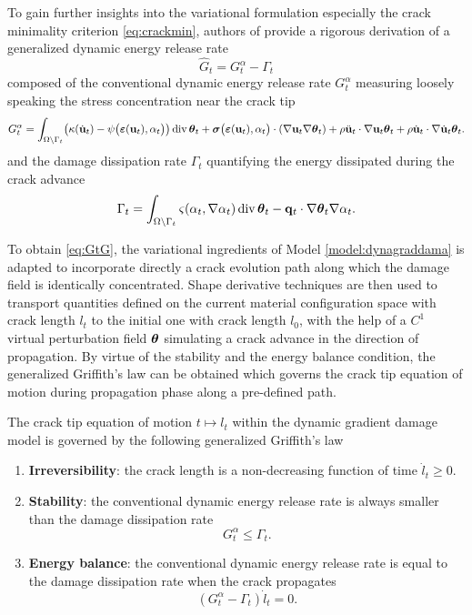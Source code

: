 To gain further insights into the variational formulation especially the crack minimality criterion \eqref{eq:crackmin}, authors of \cite{LiMarigo:2015} provide a rigorous derivation of a generalized dynamic energy release rate
\begin{equation}  \label{eq:GtG}
\widehat{G}_t=G_t^\alpha-\Gamma_t
\end{equation}
composed of the conventional dynamic energy release rate $G^\alpha_t$ measuring loosely speaking the stress concentration near the crack tip
\begin{equation} \label{eq:GtC}
G_t^\alpha=\int_\domaint\bigl(\kappa(\dot{\vec{u}}_t)-\psi\bigl(\eps(\vec{u}_t),\alpha_t\bigr)\bigr)\div\vtheta_t+\sig\bigl(\eps(\vec{u}_t),\alpha_t\bigr)\cdot(\nabla\vec{u}_t\nabla\vtheta_t)+\rho\ddot{\vec{u}}_t\cdot\nabla\vec{u}_t\vtheta_t+\rho\dot{\vec{u}}_t\cdot\nabla\dot{\vec{u}}_t\vtheta_t.
\end{equation}
and the damage dissipation rate $\Gamma_t$ quantifying the energy dissipated during the crack advance
\begin{equation} \label{eq:Gammat}
\Gamma_t=\int_\domaint\varsigma(\alpha_t,\nabla\alpha_t)\div\vtheta_t-\vec{q}_t\cdot\nabla\vtheta_t\nabla\alpha_t.
\end{equation}

To obtain \eqref{eq:GtG}, the variational ingredients of Model \ref{model:dynagraddama} is adapted to incorporate directly a crack evolution path along which the damage field is identically concentrated. Shape derivative techniques are then used to transport quantities defined on the current material configuration space with crack length $l_t$ to the initial one with crack length $l_0$, with the help of a $C^1$ virtual perturbation field $\vtheta$ simulating a crack advance in the direction of propagation. By virtue of the stability and the energy balance condition, the generalized Griffith's law can be obtained which governs the crack tip equation of motion during propagation phase along a pre-defined path.
\begin{proposition} \label{prop:Ggriffithlaw}
The crack tip equation of motion $t\mapsto l_t$ within the dynamic gradient damage model is governed by the following generalized Griffith's law
\begin{enumerate}
\item \textbf{Irreversibility}: the crack length is a non-decreasing function of time $\dot{l}_t\geq 0$.
\item \textbf{Stability}: the conventional dynamic energy release rate is always smaller than the damage dissipation rate
\[
G_t^\alpha\leq\Gamma_t.
\] 
\item \textbf{Energy balance}: the conventional dynamic energy release rate is equal to the damage dissipation rate when the crack propagates
\[
(G_t^\alpha-\Gamma_t)\dot{l}_t=0.
\] 
\end{enumerate}
\end{proposition}

